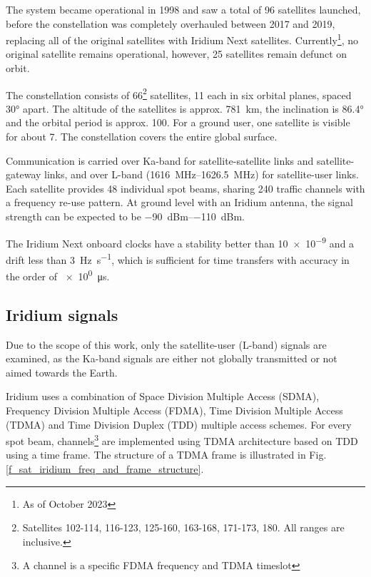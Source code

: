 The system became operational in 1998 and saw a total of 96 satellites launched, before the constellation was completely overhauled between 2017 and 2019, replacing all of the original satellites with Iridium Next satellites. Currently\footnote{As of October 2023}, no original satellite remains operational, however, 25 satellites remain defunct on orbit\cite{sat06}.

The constellation consists of 66\footnote{Satellites 102-114, 116-123, 125-160, 163-168, 171-173, 180. All ranges are inclusive.} satellites, 11 each in six orbital planes, spaced \ang{30} apart. The altitude of the satellites is approx. \qty{781}{\km}, the inclination is \ang{86.4} and the orbital period is approx. \qty{100}{\min}. For a ground user, one satellite is visible for about \qty{7}{\min}. The constellation covers the entire global surface\cite{sat01}.

Communication is carried over Ka-band for satellite-satellite links and satellite-gateway links, and over L-band (\qtyrange{1616}{1626.5}{\mega\hertz}) for satellite-user links. Each satellite provides 48 individual spot beams, sharing 240 traffic channels with a frequency re-use pattern\cite{sat07}. At ground level with an Iridium antenna, the signal strength can be expected to be \qtyrange{-90}{-110}{dBm}\cite{sop01}.

The Iridium Next onboard clocks have a stability better than \num{10e-9} and a drift less than \qty{3}{\hertz\per\s}, which is sufficient for time transfers with accuracy in the order of \qty{e0}{\micro\s}\cite{sop11}.

\subsection{Iridium signals}
\label{s_sat_iridium_signals}
Due to the scope of this work, only the satellite-user (L-band) signals are examined, as the Ka-band signals are either not globally transmitted or not aimed towards the Earth.

Iridium uses a combination of Space Division Multiple Access (SDMA),  Frequency Division Multiple Access (FDMA), Time Division Multiple Access (TDMA) and Time Division Duplex (TDD) multiple access schemes\cite{sop11}. For every spot beam, channels\footnote{A channel is a specific FDMA frequency and TDMA timeslot\cite{sat07}} are implemented using TDMA architecture based on TDD using a time frame\cite{sop12}. The structure of a TDMA frame is illustrated in Fig. \ref{f_sat_iridium_freq_and_frame_structure}.

